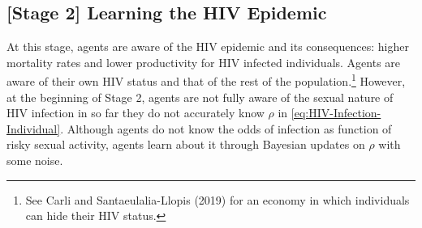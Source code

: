 \subsection*{[Stage 2] Learning the HIV Epidemic}

At this stage, agents are aware of the HIV epidemic and its consequences: higher mortality rates and lower productivity for HIV infected individuals. Agents are aware of their own HIV status and that of the rest of the population.\footnote{\sf See Carli and Santaeulalia-Llopis (2019) for an economy in which individuals can hide their HIV status.} However, at the beginning of Stage 2, agents are not fully aware of the sexual nature of HIV infection in so far they do not accurately know $\rho$ in \eqref{eq:HIV-Infection-Individual}. Although agents do not know the odds of infection as function of risky sexual activity, agents learn about it through Bayesian updates on $\rho$ with some noise. 

